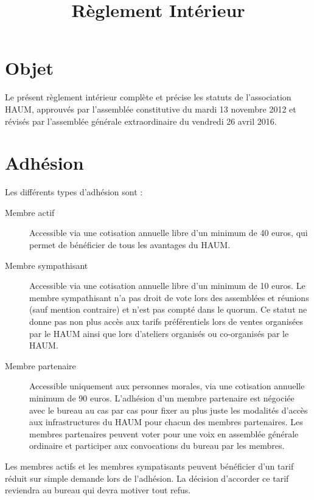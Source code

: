 \documentclass[a4paper, 11pt]{article}
\title{Règlement Intérieur}
\author{}
\date{}
\newcommand{\nomHS}{HAUM}
\newcommand{\dateAGC}{mardi 13 novembre 2012}
\newcommand{\dateAGE}{vendredi 26 avril 2016}
\newcommand{\prixNormal}{40 euros}
\newcommand{\prixSympatisant}{10 euros}
\newcommand{\prixPartenaire}{90 euros}
\begin{document}
    \maketitle

\section{Objet} %

Le présent règlement intérieur complète et précise les statuts de l'association \og{}\nomHS\fg{}, approuvés par l'assemblée
constitutive du \dateAGC{} et révisés par l'assemblée générale extraordinaire du \dateAGE{}.


\section{Adhésion} %

Les différents types d'adhésion sont :

\begin{description}
	\item[Membre actif] Accessible via une cotisation annuelle libre d'un minimum de \prixNormal{}, qui permet de bénéficier de tous les avantages du \nomHS{}.
	\item[Membre sympathisant] Accessible via une cotisation annuelle libre d'un minimum de \prixSympatisant{}. Le membre sympathisant n'a pas droit de vote lors des assemblées et réunions (sauf mention contraire) et n'est pas compté dans le quorum. Ce statut ne donne pas non plus accès aux tarifs préférentiels lors de ventes organisées par le \nomHS{} ainsi que lors d'ateliers organisés ou co-organisés par le \nomHS{}.
	\item[Membre partenaire] Accessible uniquement aux personnes morales, via une cotisation annuelle minimum de \prixPartenaire{}. L'adhésion d'un membre partenaire est négociée avec le bureau au cas par cas pour fixer au plus juste les modalités d'accès aux infrastructures du \nomHS{} pour chacun des membres partenaires. Les membres partenaires peuvent voter pour une voix en assemblée générale ordinaire et participer aux convocations du bureau par les membres.
\end{description}

Les membres actifs et les membres sympatisants peuvent bénéficier d'un tarif réduit sur simple demande lors de l'adhésion.
La décision d'accorder ce tarif reviendra au bureau qui devra motiver tout refus.
\end{document}
